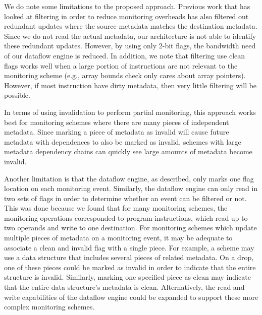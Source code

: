 We do note some limitations to the proposed approach. Previous work
\cite{fade-hpca14} that has looked at filtering in order to reduce monitoring
overheads has also filtered out redundant updates where the source metadata
matches the destination metadata. Since we do not read the actual metadata, our
architecture is not able to identify these redundant updates. However, by using
only 2-bit flags, the bandwidth need of our dataflow engine is reduced.  
In addition, we note that filtering use clean flags works well when a large
portion of instructions are not relevant to the monitoring scheme (e.g., array
bounds check only cares about array pointers). However, if most instruction
have dirty metadata, then very little filtering will be possible. 

In terms of using invalidation to perform partial monitoring, this 
approach works best for monitoring schemes where there are many pieces of
independent metadata. Since marking a piece of metadata as invalid will cause
future metadata with dependences to also be marked as invalid, schemes with
large metadata dependency chains can quickly see large amounts of metadata
become invalid. 

Another limitation is that the dataflow engine, as described, only marks one
flag location on each monitoring event. Similarly, the dataflow engine can only
read in two sets of flags in order to determine whether an event can be
filtered or not. This was done because we found that for many monitoring
schemes, the monitoring operations corresponded to program instructions, which
read up to two operands and write to one destination.  For monitoring schemes
which update multiple pieces of metadata on a monitoring event, it may be
adequate to associate a clean and invalid flag with a single piece.  For
example, a scheme may use a data structure that includes several pieces of
related metadata. On a drop, one of these pieces could be marked as invalid in
order to indicate that the entire structure is invalid.  Similarly, marking one
specified piece as clean may indicate that the entire data structure's metadata
is clean.  Alternatively, the read and write capabilities of the dataflow
engine could be expanded to support these more complex monitoring schemes.
